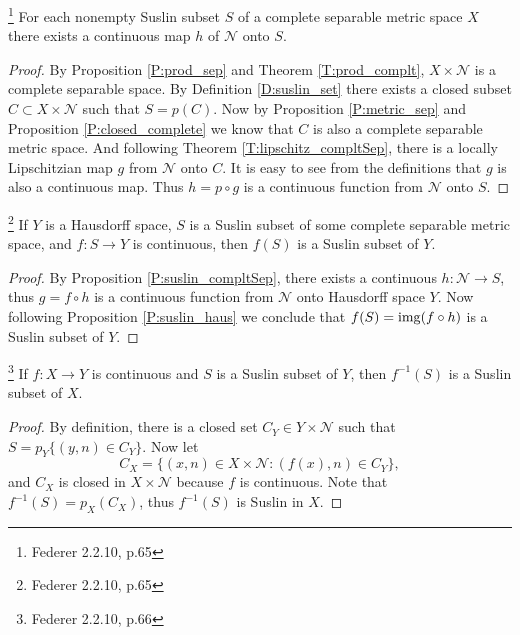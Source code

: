 \begin{proposition} \label{P:suslin_compltSep}
  \footnote{Federer 2.2.10, p.65}
	For each nonempty Suslin subset $S$ of a complete separable metric space $X$
	there exists a continuous map $h$ of $\mathcal{N}$ onto $S$.
\end{proposition}
\begin{proof}
By Proposition \ref{P:prod_sep} and Theorem \ref{T:prod_complt}, 
$X \times\mathcal{N}$ is a complete separable space. By Definition
\ref{D:suslin_set} there exists a closed subset $C\subset X\times \mathcal{N}$
such that $S=p(C)$. Now by Proposition \ref{P:metric_sep} and Proposition
\ref{P:closed_complete} we know that $C$ is also a complete separable metric
space. And following Theorem \ref{T:lipschitz_compltSep}, there is a locally
Lipschitzian map $g$ from $\mathcal{N}$ onto $C$. It is easy to see from the
definitions that $g$ is also a continuous map. Thus $h=p\circ g$ is a continuous
function from $\mathcal{N}$ onto $S$.
\end{proof}

\begin{corollary}
  \footnote{Federer 2.2.10, p.65}
	If $Y$ is a Hausdorff space, $S$ is a Suslin subset of some complete separable 
	metric space, and $f:S\to Y$ is continuous, then $f(S)$ is a Suslin subset of
	$Y$.
\end{corollary}
\begin{proof}
	By Proposition \ref{P:suslin_compltSep}, there exists a continuous
	$h:\mathcal{N}\to S$, thus $g=f\circ h$ is a continuous function from
	$\mathcal{N}$ onto Hausdorff space $Y$. Now following Proposition
	\ref{P:suslin_haus} we conclude that $f(S)=\operatorname*{img} (f\circ h)$ is a Suslin subset
	of $Y$.
\end{proof}

\begin{corollary}
  \footnote{Federer 2.2.10, p.66}
	If $f:X\to Y$ is continuous and $S$ is a Suslin subset of $Y$, then
	$f^{-1}(S)$ is a Suslin subset of $X$.
\end{corollary}
\begin{proof}
	By definition, there is a closed set $C_Y\in Y\times\mathcal{N}$ such that
	$S=p_Y\{(y,n)\in C_Y\}$. Now let
	\[
		C_X = \{(x,n)\in X\times\mathcal{N}: (f(x),n)\in C_Y\},
	\]
  and $C_X$ is closed in $X\times\mathcal{N}$ because $f$ is continuous.
	Note that $f^{-1}(S)=p_X(C_X)$, thus $f^{-1}(S)$ is Suslin in $X$. 
\end{proof}


